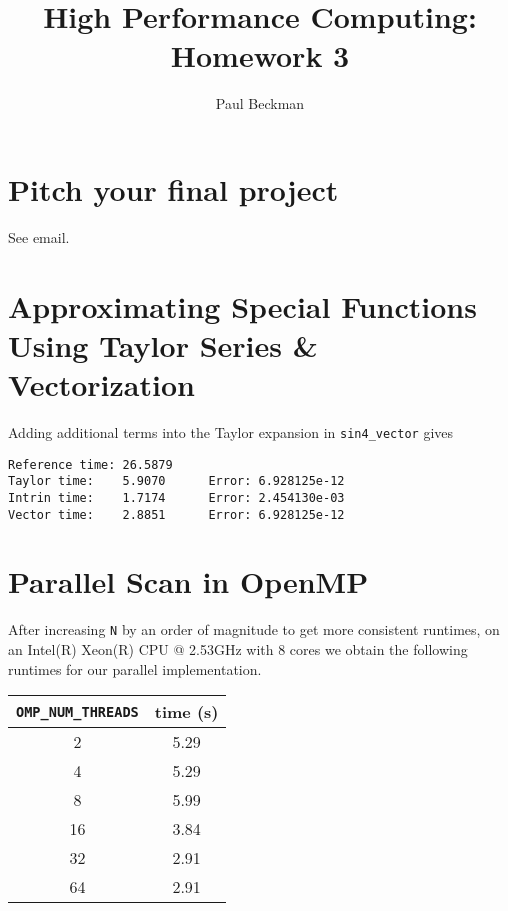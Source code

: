 \documentclass{article}
\title{High Performance Computing: Homework 3}
\author{Paul Beckman}
\date{}
\begin{document}
\maketitle

\section{Pitch your final project}
See email.

\section{Approximating Special Functions Using Taylor Series \& Vectorization}
Adding additional terms into the Taylor expansion in \texttt{sin4\_vector} gives 
\begin{verbatim}
Reference time: 26.5879
Taylor time:    5.9070      Error: 6.928125e-12
Intrin time:    1.7174      Error: 2.454130e-03
Vector time:    2.8851      Error: 6.928125e-12
\end{verbatim}

\section{Parallel Scan in OpenMP}
After increasing \texttt{N} by an order of magnitude to get more consistent runtimes, on an Intel(R) Xeon(R) CPU @ 2.53GHz with 8 cores we obtain the following runtimes for our parallel implementation.
\begin{table}[H]
  \centering
  \begin{tabular}{c|c}
    \texttt{OMP\_NUM\_THREADS} & \textbf{time (s)} \\
    \hline
    2 & 5.29 \\
    4 & 5.29 \\
    8 & 5.99 \\
    16 & 3.84 \\
    32 & 2.91 \\
    64 & 2.91 
  \end{tabular}
\end{table}
\end{document}
